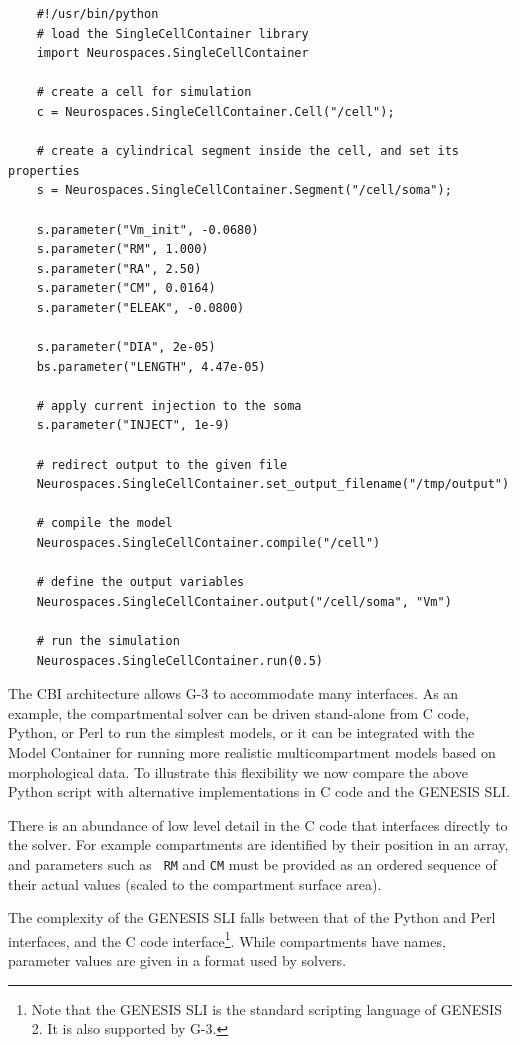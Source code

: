 \documentclass[10pt]{article}
\begin{document}
{\vspace*{1mm}
    {\begin{verbatim}
    #!/usr/bin/python
    # load the SingleCellContainer library
    import Neurospaces.SingleCellContainer

    # create a cell for simulation
    c = Neurospaces.SingleCellContainer.Cell("/cell");

    # create a cylindrical segment inside the cell, and set its properties
    s = Neurospaces.SingleCellContainer.Segment("/cell/soma");

    s.parameter("Vm_init", -0.0680)
    s.parameter("RM", 1.000)
    s.parameter("RA", 2.50)
    s.parameter("CM", 0.0164)
    s.parameter("ELEAK", -0.0800)

    s.parameter("DIA", 2e-05)
    bs.parameter("LENGTH", 4.47e-05)

    # apply current injection to the soma
    s.parameter("INJECT", 1e-9)

    # redirect output to the given file
    Neurospaces.SingleCellContainer.set_output_filename("/tmp/output")

    # compile the model
    Neurospaces.SingleCellContainer.compile("/cell")

    # define the output variables
    Neurospaces.SingleCellContainer.output("/cell/soma", "Vm")

    # run the simulation
    Neurospaces.SingleCellContainer.run(0.5)
\end{verbatim}
\vspace*{1mm}
    }
}

The CBI architecture allows G-3 to accommodate many interfaces.
As an example, the compartmental solver can be driven stand-alone from
C code, Python, or Perl to run the simplest models, or it
can be integrated with the Model Container for running more realistic
multicompartment models based on morphological data.  To illustrate
this flexibility we now compare the above Python script with
alternative implementations in C code and the GENESIS SLI.

There is an abundance of low level detail in the C code that
interfaces directly to the solver.  For example compartments are
identified by their position in an array, and parameters such as {\tt
  RM} and {\tt CM} must be provided as an ordered sequence of their
actual values (scaled to the compartment surface area).

The complexity of the GENESIS SLI falls between that of the
Python and Perl interfaces, and the C code interface\footnote{Note
  that the GENESIS SLI is the standard scripting language of
  GENESIS 2. It is also supported by G-3.}.  While compartments have
names, parameter values are given in a format used by solvers.
\end{document}
